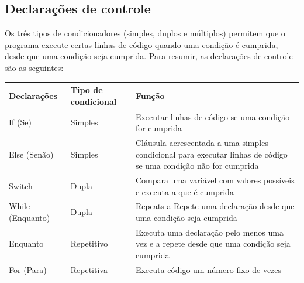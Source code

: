 \documentclass[11pt, letterpaper, portuguese]{article}
\begin{document}
\subsection{Declarações de controle}
\par{Os três tipos de condicionadores (simples, duplos e múltiplos) permitem que o programa execute certas linhas de código quando uma condição é cumprida, desde que uma condição seja cumprida. Para resumir, as declarações de controle são as seguintes:}

\begin{center}
\begin{tabular}{ | m{3cm} | m{4cm}| m{9.2cm} | } 
\hline
Declarações & Tipo de condicional & Função \\\hline
If (Se) & Simples & Executar linhas de código se uma condição for cumprida \\\hline
Else (Senão) & Simples & Cláusula acrescentada a uma simples condicional para executar linhas de código se uma condição não for cumprida
 \\\hline
Switch & Dupla & Compara uma variável com valores possíveis e executa
a que é cumprida
 \\\hline
While (Enquanto) & Dupla & Repeats a Repete uma declaração desde que uma condição seja cumprida \\\hline
Enquanto & Repetitivo & Executa uma declaração pelo menos uma vez e a repete desde que uma condição seja cumprida \\\hline
For (Para) & Repetitiva & Executa código um número fixo de vezes\\\hline
\end{tabular}
\end{center}


\newpage 



\end{document}
